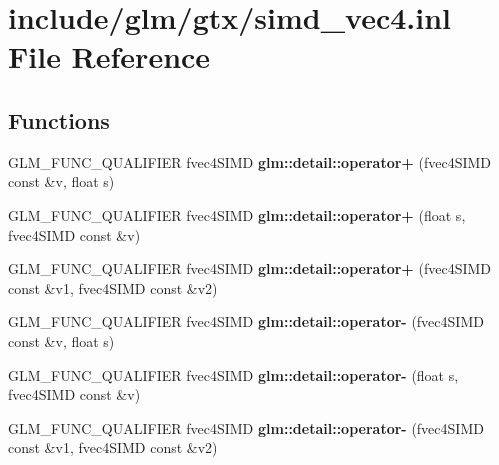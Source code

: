 \hypertarget{simd__vec4_8inl}{}\section{include/glm/gtx/simd\+\_\+vec4.inl File Reference}
\label{simd__vec4_8inl}
\subsection*{Functions}
\begin{DoxyCompactItemize}
\item 
\mbox{\label{simd__vec4_8inl_a45efa4aad92d96409a70747c0dc60002}} 
G\+L\+M\+\_\+\+F\+U\+N\+C\+\_\+\+Q\+U\+A\+L\+I\+F\+I\+ER fvec4\+S\+I\+MD {\bfseries glm\+::detail\+::operator+} (fvec4\+S\+I\+MD const \&v, float s)
\item 
\mbox{\label{simd__vec4_8inl_adf78a90e11a6b2bdf419cc04fae5407c}} 
G\+L\+M\+\_\+\+F\+U\+N\+C\+\_\+\+Q\+U\+A\+L\+I\+F\+I\+ER fvec4\+S\+I\+MD {\bfseries glm\+::detail\+::operator+} (float s, fvec4\+S\+I\+MD const \&v)
\item 
\mbox{\label{simd__vec4_8inl_a015946565bf753ced27292739ae9212d}} 
G\+L\+M\+\_\+\+F\+U\+N\+C\+\_\+\+Q\+U\+A\+L\+I\+F\+I\+ER fvec4\+S\+I\+MD {\bfseries glm\+::detail\+::operator+} (fvec4\+S\+I\+MD const \&v1, fvec4\+S\+I\+MD const \&v2)
\item 
\mbox{\label{simd__vec4_8inl_a2ccde71dbbac0adcfa13ee322d5313eb}} 
G\+L\+M\+\_\+\+F\+U\+N\+C\+\_\+\+Q\+U\+A\+L\+I\+F\+I\+ER fvec4\+S\+I\+MD {\bfseries glm\+::detail\+::operator-\/} (fvec4\+S\+I\+MD const \&v, float s)
\item 
\mbox{\label{simd__vec4_8inl_aeb2f0978202f5110b6303a3151797240}} 
G\+L\+M\+\_\+\+F\+U\+N\+C\+\_\+\+Q\+U\+A\+L\+I\+F\+I\+ER fvec4\+S\+I\+MD {\bfseries glm\+::detail\+::operator-\/} (float s, fvec4\+S\+I\+MD const \&v)
\item 
\mbox{\label{simd__vec4_8inl_a2e5e6062fe6a3f295b0f17a9bf4463e0}} 
G\+L\+M\+\_\+\+F\+U\+N\+C\+\_\+\+Q\+U\+A\+L\+I\+F\+I\+ER fvec4\+S\+I\+MD {\bfseries glm\+::detail\+::operator-\/} (fvec4\+S\+I\+MD const \&v1, fvec4\+S\+I\+MD const \&v2)

\end{DoxyCompactItemize}
